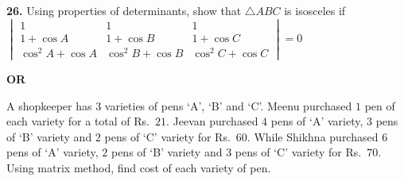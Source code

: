 \documentclass[12pt]{article}
\begin{document}
\vspace{0.2cm}

\textbf{26.} Using properties of determinants, show that $\triangle ABC$ is isosceles if
$
\begin{vmatrix}
1 & 1 & 1 \\
1+\cos A & 1+\cos B & 1+\cos C \\
\cos^2 A+\cos A & \cos^2 B+\cos B & \cos^2 C+\cos C
\end{vmatrix}
=0
$

\textbf{OR}

A shopkeeper has $3$ varieties of pens `A', `B' and `C'. Meenu purchased $1$ pen of each variety for a total of Rs.\ $21$. Jeevan purchased $4$ pens of `A' variety, $3$ pens of `B' variety and $2$ pens of `C' variety for Rs.\ $60$. While Shikhna purchased $6$ pens of `A' variety, $2$ pens of `B' variety and $3$ pens of `C' variety for Rs.\ $70$. Using matrix method, find cost of each variety of pen.
\end{document}
